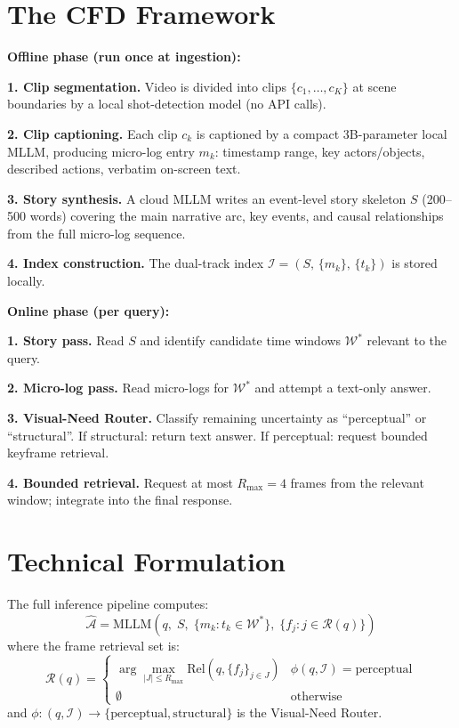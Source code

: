 \documentclass[10pt,twocolumn]{article}
\begin{document}
\section{The CFD Framework}

\textbf{Offline phase (run once at ingestion):}

\textbf{1. Clip segmentation.} Video is divided into clips
$\{c_1, \ldots, c_K\}$ at scene boundaries by a local shot-detection
model (no API calls).

\textbf{2. Clip captioning.} Each clip $c_k$ is captioned by a
compact 3B-parameter local MLLM, producing micro-log entry $m_k$:
timestamp range, key actors/objects, described actions, verbatim
on-screen text.

\textbf{3. Story synthesis.} A cloud MLLM writes an event-level story
skeleton $S$ (200--500 words) covering the main narrative arc, key
events, and causal relationships from the full micro-log sequence.

\textbf{4. Index construction.} The dual-track index
$\mathcal{I} = (S,\, \{m_k\},\, \{t_k\})$ is stored locally.

\textbf{Online phase (per query):}

\textbf{1. Story pass.} Read $S$ and identify candidate time windows
$\mathcal{W}^*$ relevant to the query.

\textbf{2. Micro-log pass.} Read micro-logs for $\mathcal{W}^*$ and
attempt a text-only answer.

\textbf{3. Visual-Need Router.} Classify remaining uncertainty as
``perceptual'' or ``structural''. If structural: return text answer.
If perceptual: request bounded keyframe retrieval.

\textbf{4. Bounded retrieval.} Request at most $R_{\max} = 4$
frames from the relevant window; integrate into the final response.

\section{Technical Formulation}

The full inference pipeline computes:
\[
  \hat{\mathcal{A}} = \mathrm{MLLM}\!\left(
    q,\; S,\; \{m_k : t_k \in \mathcal{W}^*\},\;
    \{f_j : j \in \mathcal{R}(q)\}
  \right)
\]
where the frame retrieval set is:
\[
  \mathcal{R}(q) = \begin{cases}
    \arg\max_{|J| \leq R_{\max}} \mathrm{Rel}(q, \{f_j\}_{j \in J})
      & \phi(q, \mathcal{I}) = \mathrm{perceptual} \\
    \emptyset & \text{otherwise}
  \end{cases}
\]
and $\phi: (q, \mathcal{I}) \to \{\mathrm{perceptual}, \mathrm{structural}\}$
is the Visual-Need Router.
\end{document}
